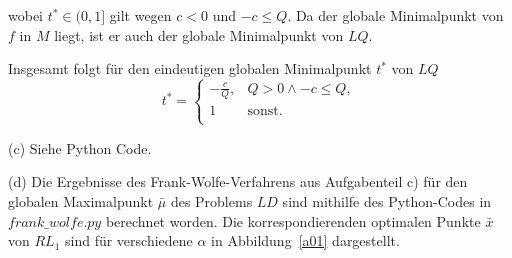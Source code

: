 \documentclass[ngerman, a4paper,12pt]{article}
\begin{document}
wobei $t^* \in (0,1]$ gilt wegen $c<0$ und $-c\leq Q$. Da der globale Minimalpunkt von $f$ in $M$ liegt, ist er auch der globale Minimalpunkt von $LQ$. \par
Insgesamt folgt für den eindeutigen globalen Minimalpunkt $t^*$ von $LQ$
\begin{equation*}
	t^* = 
		\begin{cases}
		-\frac{c}{Q},& Q>0 \land -c \leq Q,\\
		1 & \text{sonst}.\\
	\end{cases}
\end{equation*}
\par
(c) Siehe Python Code.
\par
(d) Die Ergebnisse des Frank-Wolfe-Verfahrens aus Aufgabenteil c) für den globalen Maximalpunkt $\bar{\mu}$ des Problems $LD$ sind mithilfe des Python-Codes in $frank\_wolfe.py$ berechnet worden. Die korrespondierenden optimalen Punkte $\bar{x}$ von $RL_1$ sind für verschiedene $\alpha$ in Abbildung~\ref{a01} dargestellt.
\end{document}
